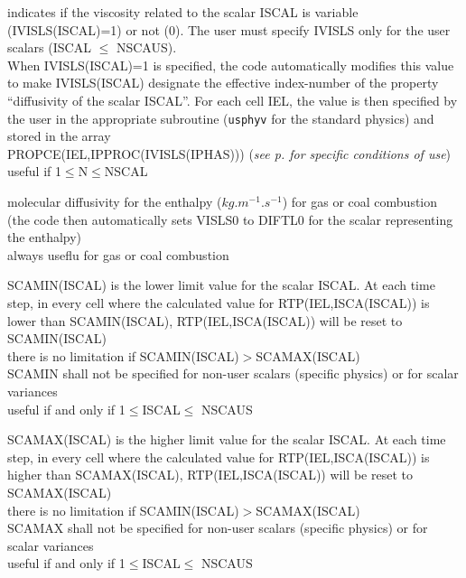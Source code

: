 {indicates if the viscosity related to the scalar ISCAL is variable
(IVISLS(ISCAL)=1) or not (0). The user must specify IVISLS only for the
user scalars (ISCAL $\leqslant$ NSCAUS).\\
When IVISLS(ISCAL)=1 is specified, the code automatically modifies this value to
make IVISLS(ISCAL) designate the effective index-number of the property
``diffusivity of the scalar ISCAL''. For each cell IEL, the value
is then specified by the user in the appropriate subroutine
(\texttt{usphyv} for the standard physics) and stored in the array\\
PROPCE(IEL,IPPROC(IVISLS(IPHAS)))
({\em see p.\pageref{prg_propvar} for specific conditions of use})\\
useful if 1$\leqslant$N$\leqslant$NSCAL}


{molecular diffusivity for the enthalpy ($kg.m^{-1}.s^{-1}$) for gas or coal
combustion (the code then automatically sets VISLS0 to DIFTL0 for the scalar
representing the enthalpy)\\
always useflu for gas or coal combustion}

{SCAMIN(ISCAL) is the lower limit value for the scalar ISCAL. At each time step,
in every cell where the calculated value for RTP(IEL,ISCA(ISCAL)) is lower than
\mbox{SCAMIN(ISCAL)}, RTP(IEL,ISCA(ISCAL)) will be reset to
\mbox{SCAMIN(ISCAL)}\\
there is no limitation if SCAMIN(ISCAL)$>$SCAMAX(ISCAL)\\
SCAMIN shall not be specified for non-user scalars (specific physics) or for
scalar variances\\
useful if and only if 1$\leqslant$ISCAL$\leqslant$ NSCAUS}

{SCAMAX(ISCAL) is the higher limit value for the scalar ISCAL. At each time step,
in every cell where the calculated value for RTP(IEL,ISCA(ISCAL)) is higher than
\mbox{SCAMAX(ISCAL)}, RTP(IEL,ISCA(ISCAL)) will be reset to
\mbox{SCAMAX(ISCAL)}\\
there is no limitation if SCAMIN(ISCAL)$>$SCAMAX(ISCAL)\\
SCAMAX shall not be specified for non-user scalars (specific physics) or for
scalar variances\\
useful if and only if 1$\leqslant$ISCAL$\leqslant$ NSCAUS}

